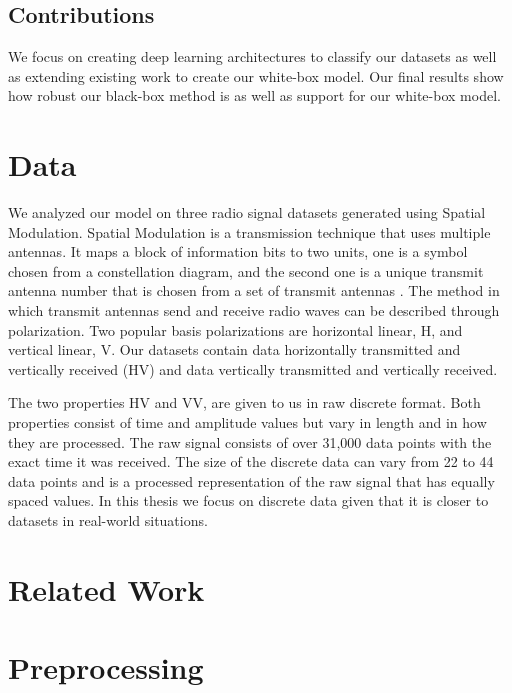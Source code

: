 \documentclass{turabian-thesis}
\begin{document}
\section{Contributions}
We focus on creating deep learning architectures to classify our datasets as well as extending existing work to create our white-box model. Our final results show how robust our black-box method is as well as support for our white-box model.


\chapter{Data}

We analyzed our model on three radio signal datasets generated using Spatial Modulation. Spatial Modulation is a transmission technique that uses multiple antennas. It maps a block of information bits to two units, one is a symbol chosen from a constellation diagram, and the second one is a unique transmit antenna number that is chosen from a set of transmit antennas \cite{mesleh_spatial_2008}. The method in which transmit antennas send and receive radio waves can be described through polarization. Two popular basis polarizations are horizontal linear, H, and vertical linear, V. Our datasets contain data horizontally transmitted and vertically received (HV) and data vertically transmitted and vertically received.

The two properties HV and VV, are given to us in raw discrete format. Both properties consist of time and amplitude values but vary in length and in how they are processed. The raw signal consists of over 31,000 data points with the exact time it was received. The size of the discrete data can vary from 22 to 44 data points and is a processed representation of the raw signal that has equally spaced values. In this thesis we focus on discrete data given that it is closer to datasets in real-world situations.


\chapter{Related Work}
\label{chap:relatedwork}

\chapter{Preprocessing}
\label{chap:preprocessing}
\end{document}
